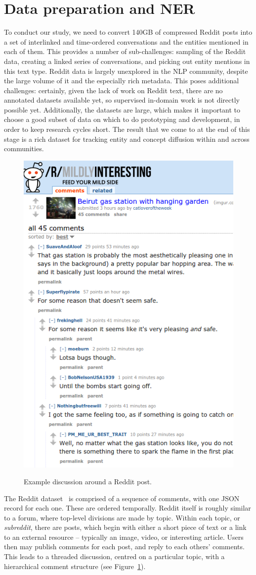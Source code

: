 \documentclass[journal,10pt,draftclsnofoot,onecolumn]{IEEEtran}
\begin{document}
%


\section{Data preparation and NER}
To conduct our study, we need to convert 140GB of compressed Reddit posts into a set of interlinked and time-ordered conversations and the entities mentioned in each of them.
This provides a number of sub-challenges: sampling of the Reddit data, creating a linked series of conversations, and picking out entity mentions in this text type.
Reddit data is largely unexplored in the NLP community, despite the large volume of it and the especially rich metadata.
This poses additional challenges: certainly, given the lack of work on Reddit text, there are no annotated datasets available yet, so supervised in-domain work is not directly possible yet.
Additionally, the datasets are large, which makes it important to choose a good subset of data on which to do prototyping and development, in order to keep research cycles short.
The result that we come to at the end of this stage is a rich dataset for tracking entity and concept diffusion within and across communities.

\begin{figure}
\centering
\includegraphics[width=0.4\columnwidth]{reddit-example.png}
\label{fig:reddit-example}
\caption{Example discussion around a Reddit post.}
\end{figure}

The Reddit dataset~\cite{reddit-data} is comprised of a sequence of comments, with one JSON record for each one.
These are ordered temporally.
Reddit itself is roughly similar to a forum, where top-level divisions are made by topic.
Within each topic, or {\em subreddit}, there are posts, which begin with either a short piece of text or a link to an external resource -- typically an image, video, or interesting article.
Users then may publish comments for each post, and reply to each others' comments.
This leads to a threaded discussion, centred on a particular topic, with a hierarchical comment structure (see Figure~\ref{fig:reddit-example}).
\end{document}
